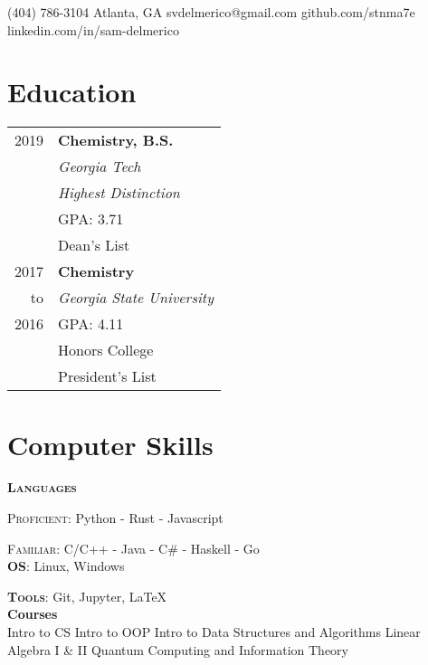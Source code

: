 \documentclass{tccv}
\begin{document}
    {(404) 786-3104}
    {Atlanta, GA}
    {}
    {svdelmerico@gmail.com}
    {github.com/stnma7e}
    {linkedin.com/in/sam-delmerico}

\begin{minipage}[t]{0.35\textwidth}
    \section{Education}
    \begin{tabular}{rl}
        2019 & \textbf{Chemistry, B.S.} \\
             & \emph{Georgia Tech} \\
             & \emph{Highest Distinction} \\
             & GPA: 3.71 \\
             & Dean's List \\
        
        2017 & \textbf{Chemistry} \\
        to   & \emph{Georgia State University} \\
        2016 & GPA: 4.11 \\
             & Honors College \\
             & President's List
    \end{tabular}

    \section{Computer Skills}
    \textbf{\textsc{Languages}}
    
    \textsc{Proficient:} Python - Rust - Javascript
    
    \textsc{Familiar:}
    {
        C/C++ - Java - C\# - Haskell - Go
    } \\
    
    \textbf{\textsc{OS}}:
        Linux, Windows
   
    \textbf{\textsc{Tools}}:
        Git, Jupyter, \LaTeX{} \\
    
    \textbf{Courses} \\
        Intro to CS \newline
        Intro to OOP \newline
        Intro to Data Structures and Algorithms \newline
        Linear Algebra I \& II \newline
        Quantum Computing and Information Theory
        

\end{minipage}
\end{document}
